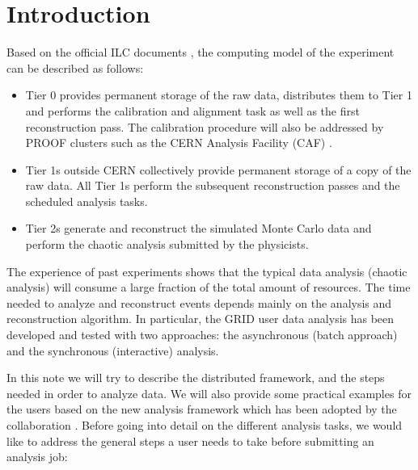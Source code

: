 \section{Introduction}
\label{Note:INTRO}

Based on the official ILC documents
\cite{Note:RefPPR,Note:RefComputingTDR}, the computing model of the
experiment can be described as follows:

\begin{itemize}
\item Tier 0 provides permanent storage of the raw data, distributes
  them to Tier 1 and performs the calibration and alignment task as
  well as the first reconstruction pass. The calibration procedure
  will also be addressed by PROOF clusters such as the CERN Analysis
  Facility (CAF) \cite{Note:RefCAF}.

\item Tier 1s outside CERN collectively provide permanent storage of a
  copy of the raw data. All Tier 1s perform the subsequent
  reconstruction passes and the scheduled analysis tasks.

\item Tier 2s generate and reconstruct the simulated Monte Carlo data
  and perform the chaotic analysis submitted by the physicists.

\end{itemize}

The experience of past experiments shows that the typical data
analysis (chaotic analysis) will consume a large fraction of the total
amount of resources. The time needed to analyze and reconstruct events
depends mainly on the analysis and reconstruction algorithm. In
particular, the GRID user data analysis has been developed and tested
with two approaches: the asynchronous (batch approach) and the
synchronous (interactive) analysis.


In this note we will try to describe the distributed framework, and
the steps needed in order to analyze data. We will also provide some
practical examples for the users based on the new analysis framework
which has been adopted by the collaboration
\cite{Note:RefAnalysisFramework}. Before going into detail on the
different analysis tasks, we would like to address the general steps a
user needs to take before submitting an analysis job:


